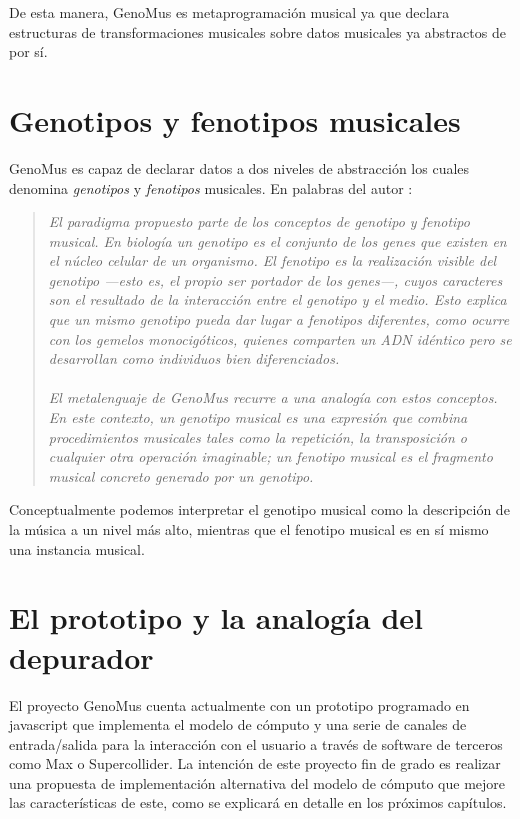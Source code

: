 De esta manera, GenoMus es metaprogramación musical ya que declara estructuras de transformaciones musicales sobre datos musicales ya abstractos de por sí.

\section{Genotipos y fenotipos musicales}

GenoMus es capaz de declarar datos a dos niveles de abstracción los cuales denomina \textit{genotipos} y \textit{fenotipos} musicales. En palabras del autor \cite{GenoMus-aproximacion-creatividad}:

\begin{quote}
    \textit{El paradigma propuesto parte de los conceptos de genotipo y fenotipo musical. En biología un genotipo es el conjunto de los genes que existen en el núcleo celular de un organismo. El fenotipo es la realización visible del genotipo —esto es, el propio ser portador de los genes—, cuyos caracteres son el resultado de la interacción entre el genotipo y el medio. Esto explica que un mismo genotipo pueda dar lugar a fenotipos diferentes, como ocurre con los gemelos monocigóticos, quienes comparten un ADN idéntico pero se desarrollan como individuos bien diferenciados. \\ \\
    El metalenguaje de GenoMus recurre a una analogía con estos conceptos. En este contexto, un genotipo musical es una expresión que combina procedimientos musicales tales como la repetición, la transposición o cualquier otra operación imaginable; un fenotipo musical es el fragmento musical concreto generado por un genotipo.}
\end{quote}

Conceptualmente podemos interpretar el genotipo musical como la descripción de la música a un nivel más alto, mientras que el fenotipo musical es en sí mismo una instancia musical.

\section{El prototipo y la analogía del depurador}

El proyecto GenoMus cuenta actualmente con un prototipo programado en javascript que implementa el modelo de cómputo y una serie de canales de entrada/salida para la interacción con el usuario a través de software de terceros como Max o Supercollider. La intención de este proyecto fin de grado es realizar una propuesta de implementación alternativa del modelo de cómputo que mejore las características de este, como se explicará en detalle en los próximos capítulos.

